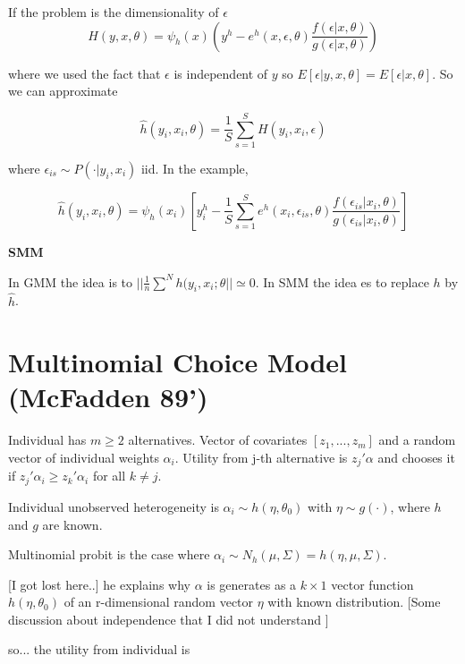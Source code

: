 \documentclass[12pt]{article}
\begin{document}
If the problem is the dimensionality of $\epsilon$ 
\begin{equation*}
	H(y,x,\theta) = \psi_h(x) \left( y^h - e^h(x,\epsilon, \theta) \frac{f(\epsilon | x, \theta)}{g(\epsilon | x, \theta)}\right)
\end{equation*}
 
 where we used the fact that $\epsilon$ is independent of $y$ so $E[\epsilon | y,x,\theta] = E[\epsilon | x,\theta]$. So we can approximate
 
 \begin{equation*}
 	\hat{h}(y_i, x_i, \theta) = \frac{1}{S} \sum^S_{s = 1} H(y_i, x_i, \epsilon) 
 \end{equation*}

where $\epsilon_{is} \sim P(\cdot| y_i,x_i)$ iid. In the example, 

\begin{equation}
	\hat{h}(y_i, x_i, \theta) = \psi_h(x_i) \left[ y^h_i - \frac{1}{S} \sum^S_{s = 1} e^h(x_i, \epsilon_{is}, \theta) \frac{f(\epsilon_{is} | x_i, \theta)}{g(\epsilon_{is} | x_i, \theta)} \right]
\end{equation}

\textbf{SMM}

In GMM the idea is to $|| \frac{1}{n} \sum^N h(y_i,x_i; \theta || \simeq 0$. In SMM the idea es to replace $h$ by $\hat{h}$. 

\section*{Multinomial Choice Model (McFadden 89')}

Individual has $m \geq 2$ alternatives. Vector of covariates $[z_1, ..., z_m]$ and a random vector of individual weights $\alpha_i$. Utility from j-th alternative is $z_j'\alpha$ and chooses it if $z_j' \alpha_i \geq z_k' \alpha_i$ for all $k \neq j$. 

Individual unobserved heterogeneity is $\alpha_i \sim h(\eta, \theta_0)$ with $\eta \sim g(\cdot)$, where $h$ and $g$ are known. 

Multinomial probit is the case where $\alpha_i \sim N_h (\mu, \Sigma) = h(\eta,\mu,\Sigma)$. 

[I got lost here..] he explains why $\alpha$ is generates as a $k \times 1$ vector function  $h(\eta,\theta_0)$ of an r-dimensional random vector $\eta$ with known distribution. [Some discussion about independence that I did not understand ]

so... the utility from individual is
\end{document}
